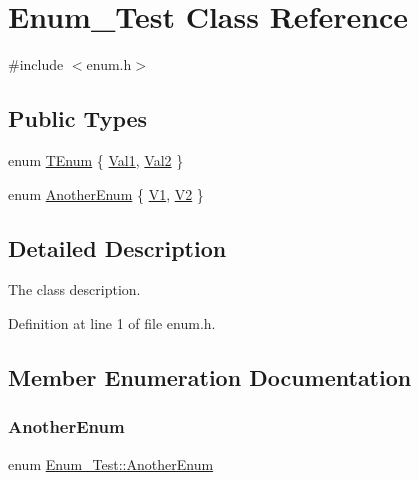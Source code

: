 \hypertarget{class_enum___test}{}\section{Enum\+\_\+\+Test Class Reference}
\label{class_enum___test}


{\ttfamily \#include $<$enum.\+h$>$}

\subsection*{Public Types}
\begin{DoxyCompactItemize}
\item 
enum \mbox{\hyperlink{class_enum___test_a8d096bc026dbb395991f02e3ca86eb1c}{T\+Enum}} \{ \mbox{\hyperlink{class_enum___test_a8d096bc026dbb395991f02e3ca86eb1ca88efe763d7807db8a48f6e685277d7fd}{Val1}}, 
\mbox{\hyperlink{class_enum___test_a8d096bc026dbb395991f02e3ca86eb1ca284b56694c3f4513699fc86ea30527b0}{Val2}}
 \}
\item 
enum \mbox{\hyperlink{class_enum___test_a633286511e19b996e97699d7dd2cd2a0}{Another\+Enum}} \{ \mbox{\hyperlink{class_enum___test_a633286511e19b996e97699d7dd2cd2a0ab0e5fe049a18d196b564c00bb241722f}{V1}}, 
\mbox{\hyperlink{class_enum___test_a633286511e19b996e97699d7dd2cd2a0ae83b4255ceeedf0c49dd65d1eff8b750}{V2}}
 \}
\end{DoxyCompactItemize}


\subsection{Detailed Description}
The class description. 

Definition at line 1 of file enum.\+h.



\subsection{Member Enumeration Documentation}
\mbox{\label{class_enum___test_a633286511e19b996e97699d7dd2cd2a0}} 
\subsubsection{\texorpdfstring{AnotherEnum}{AnotherEnum}}
{\footnotesize\ttfamily enum \mbox{\hyperlink{class_enum___test_a633286511e19b996e97699d7dd2cd2a0}{Enum\+\_\+\+Test\+::\+Another\+Enum}}}

